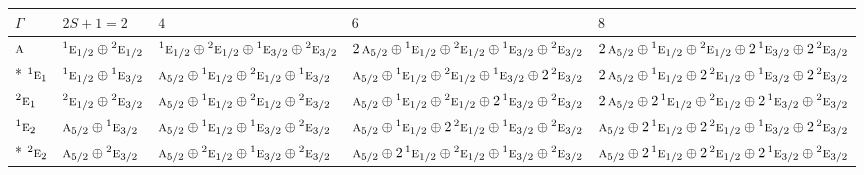 \documentclass[10pt,a4paper]{article}
\numberwithin{equation}{section}
\newcommand{\irr}[1]{\text{\normalfont\scshape #1}}
\newcommand{\conjpair}[1]{{}^{#1}}
\begin{document}
{\small\setlength{\tabcolsep}{3pt}\begin{longtable}{@{}l>{\RaggedRight\arraybackslash}p{}>{\RaggedRight\arraybackslash}p{}>{\RaggedRight\arraybackslash}p{}>{\RaggedRight\arraybackslash}p{}@{}}\toprule
$\Gamma$ & $2S + 1 = 2$ & $4$ & $6$ & $8$\\\midrule\endhead
\bottomrule\endfoot\endlastfoot
$\irr{a}$ & $\conjpair{1}\irr{e}_{1/2}\oplus \conjpair{2}\irr{e}_{1/2}$ & $\conjpair{1}\irr{e}_{1/2}\oplus \conjpair{2}\irr{e}_{1/2}\oplus \conjpair{1}\irr{e}_{3/2}\oplus \conjpair{2}\irr{e}_{3/2}$ & $2\,\irr{a}_{5/2}\oplus \conjpair{1}\irr{e}_{1/2}\oplus \conjpair{2}\irr{e}_{1/2}\oplus \conjpair{1}\irr{e}_{3/2}\oplus \conjpair{2}\irr{e}_{3/2}$ & $2\,\irr{a}_{5/2}\oplus \conjpair{1}\irr{e}_{1/2}\oplus \conjpair{2}\irr{e}_{1/2}\oplus 2\,\conjpair{1}\irr{e}_{3/2}\oplus 2\,\conjpair{2}\irr{e}_{3/2}$\\*
$\conjpair{1}\irr{e}_{1}$ & $\conjpair{1}\irr{e}_{1/2}\oplus \conjpair{1}\irr{e}_{3/2}$ & $\irr{a}_{5/2}\oplus \conjpair{1}\irr{e}_{1/2}\oplus \conjpair{2}\irr{e}_{1/2}\oplus \conjpair{1}\irr{e}_{3/2}$ & $\irr{a}_{5/2}\oplus \conjpair{1}\irr{e}_{1/2}\oplus \conjpair{2}\irr{e}_{1/2}\oplus \conjpair{1}\irr{e}_{3/2}\oplus 2\,\conjpair{2}\irr{e}_{3/2}$ & $2\,\irr{a}_{5/2}\oplus \conjpair{1}\irr{e}_{1/2}\oplus 2\,\conjpair{2}\irr{e}_{1/2}\oplus \conjpair{1}\irr{e}_{3/2}\oplus 2\,\conjpair{2}\irr{e}_{3/2}$\\
$\conjpair{2}\irr{e}_{1}$ & $\conjpair{2}\irr{e}_{1/2}\oplus \conjpair{2}\irr{e}_{3/2}$ & $\irr{a}_{5/2}\oplus \conjpair{1}\irr{e}_{1/2}\oplus \conjpair{2}\irr{e}_{1/2}\oplus \conjpair{2}\irr{e}_{3/2}$ & $\irr{a}_{5/2}\oplus \conjpair{1}\irr{e}_{1/2}\oplus \conjpair{2}\irr{e}_{1/2}\oplus 2\,\conjpair{1}\irr{e}_{3/2}\oplus \conjpair{2}\irr{e}_{3/2}$ & $2\,\irr{a}_{5/2}\oplus 2\,\conjpair{1}\irr{e}_{1/2}\oplus \conjpair{2}\irr{e}_{1/2}\oplus 2\,\conjpair{1}\irr{e}_{3/2}\oplus \conjpair{2}\irr{e}_{3/2}$\\
$\conjpair{1}\irr{e}_{2}$ & $\irr{a}_{5/2}\oplus \conjpair{1}\irr{e}_{3/2}$ & $\irr{a}_{5/2}\oplus \conjpair{1}\irr{e}_{1/2}\oplus \conjpair{1}\irr{e}_{3/2}\oplus \conjpair{2}\irr{e}_{3/2}$ & $\irr{a}_{5/2}\oplus \conjpair{1}\irr{e}_{1/2}\oplus 2\,\conjpair{2}\irr{e}_{1/2}\oplus \conjpair{1}\irr{e}_{3/2}\oplus \conjpair{2}\irr{e}_{3/2}$ & $\irr{a}_{5/2}\oplus 2\,\conjpair{1}\irr{e}_{1/2}\oplus 2\,\conjpair{2}\irr{e}_{1/2}\oplus \conjpair{1}\irr{e}_{3/2}\oplus 2\,\conjpair{2}\irr{e}_{3/2}$\\*
$\conjpair{2}\irr{e}_{2}$ & $\irr{a}_{5/2}\oplus \conjpair{2}\irr{e}_{3/2}$ & $\irr{a}_{5/2}\oplus \conjpair{2}\irr{e}_{1/2}\oplus \conjpair{1}\irr{e}_{3/2}\oplus \conjpair{2}\irr{e}_{3/2}$ & $\irr{a}_{5/2}\oplus 2\,\conjpair{1}\irr{e}_{1/2}\oplus \conjpair{2}\irr{e}_{1/2}\oplus \conjpair{1}\irr{e}_{3/2}\oplus \conjpair{2}\irr{e}_{3/2}$ & $\irr{a}_{5/2}\oplus 2\,\conjpair{1}\irr{e}_{1/2}\oplus 2\,\conjpair{2}\irr{e}_{1/2}\oplus 2\,\conjpair{1}\irr{e}_{3/2}\oplus \conjpair{2}\irr{e}_{3/2}$\\
\bottomrule\end{longtable}}
\end{document}
